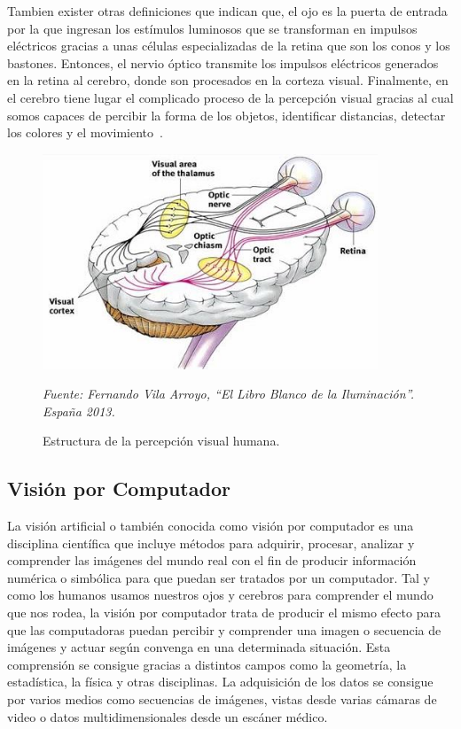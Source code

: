 Tambien exister otras definiciones que indican que, el ojo es la puerta de entrada por la que ingresan los estímulos luminosos que se transforman en impulsos eléctricos gracias a unas células especializadas de la retina que son los conos y los bastones. Entonces, el nervio óptico transmite los impulsos eléctricos generados en la retina al cerebro, donde son procesados en la corteza visual. Finalmente, en el cerebro tiene lugar el complicado proceso de la percepción visual gracias al cual somos capaces de percibir la forma de los objetos, identificar distancias, detectar los colores y el movimiento~\cite{14alonso2005personas}.


        \begin{figure}[H]
		\centering
		\includegraphics[width=100mm]{Imagenes/estructura_percepcion.jpg}
		\caption{Estructura de la percepción visual humana.}
		\vspace{0.15cm}
		\textit{Fuente: Fernando Vila Arroyo, “El Libro Blanco de la Iluminación”. España 2013.}
		\label{fig:estructura_percepcion}
		\end{figure}      	  

\subsection{Visión por Computador}
La visión artificial o también conocida como visión por computador es una disciplina científica que incluye métodos para adquirir, procesar, analizar y comprender las imágenes del mundo real con el fin de producir información numérica o simbólica para que puedan ser tratados por un computador. Tal y como los humanos usamos nuestros ojos y cerebros para comprender el mundo que nos rodea, la visión por computador trata de producir el mismo efecto para que las computadoras puedan percibir y comprender una imagen o secuencia de imágenes y actuar según convenga en una determinada situación. Esta comprensión se consigue gracias a distintos campos como la geometría, la estadística, la física y otras disciplinas. La adquisición de los datos se consigue por varios medios como secuencias de imágenes, vistas desde varias cámaras de video o datos multidimensionales desde un
escáner médico.


